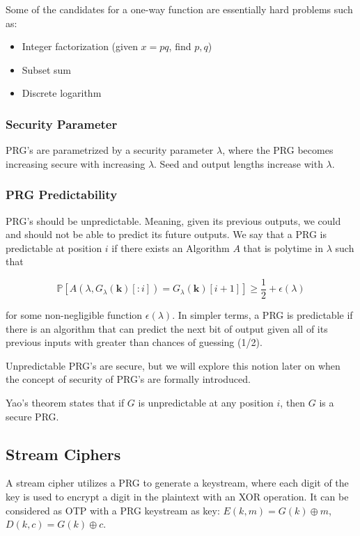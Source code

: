 \documentclass{article}
\begin{document}
\begin{multicols}{2}
Some of the candidates for a one-way function are essentially hard problems such as:

\begin{itemize}
    \item Integer factorization (given $x = pq$, find $p,q$) 
    \item Subset sum
    \item Discrete logarithm
\end{itemize}

\subsubsection {Security Parameter}

PRG's are parametrized by a security parameter $\lambda$, where the PRG becomes increasing secure with increasing $\lambda$. Seed and output lengths increase with $\lambda$.

\subsubsection {PRG Predictability}

PRG's should be unpredictable. Meaning, given its previous outputs, we could and should not be able to predict its future outputs. We say that a PRG is predictable at position $i$ if there exists an Algorithm $A$ that is polytime in $\lambda$ such that

$$
\mathbb{P}[A(\lambda, G_\lambda(\mathbf{k})[:i]) = G_\lambda(\mathbf{k})[i+1]] \geq \frac{1}{2} + \epsilon(\lambda)
$$

for some non-negligible function $\epsilon(\lambda)$. In simpler terms, a PRG is predictable if there is an algorithm that can predict the next bit of output given all of its previous inputs with greater than chances of guessing (1/2).

Unpredictable PRG's are secure, but we will explore this notion later on when the concept of security of PRG's are formally introduced.

Yao's theorem states that if $G$ is unpredictable at any position $i$, then $G$ is a secure PRG.

\subsection {Stream Ciphers}

A stream cipher utilizes a PRG to generate a keystream, where each digit of the key is used to encrypt a digit in the plaintext with an XOR operation. It can be considered as OTP with a PRG keystream as key: $E(k,m) = G(k) \oplus m$, $D(k,c) = G(k) \oplus c$. 


\end{multicols}
\end{document}
